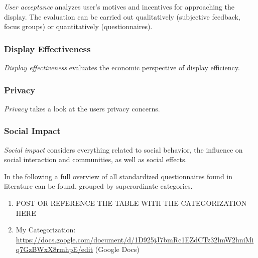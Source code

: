 		\textit{User acceptance} analyzes user's motives and incentives for approaching the display. The evaluation can be carried out qualitatively (subjective feedback, focus groups) or quantitatively (questionnaires).

	\subsubsection{Display Effectiveness}
		\textit{Display effectiveness} evaluates the economic perspective of display efficiency. 

	\subsubsection{Privacy}
		\textit{Privacy} takes a look at the users privacy concerns.

	\subsubsection{Social Impact}
		\textit{Social impact} considers everything related to social behavior, the influence on social interaction and communities, as well as social effects.











	In the following a full overview of all standardized questionnaires found in literature can be found, grouped by superordinate categories.



		\label{table:standardized-questionnaires}


		\begin{enumerate}
			\item POST OR REFERENCE THE TABLE WITH THE CATEGORIZATION HERE
			\item My Categorization: \url{https://docs.google.com/document/d/1D925jJ7bmRc1EZdCTz32lmW2hniMiq7GzBWxX8rmhpE/edit} (Google Docs)
		\end{enumerate}

